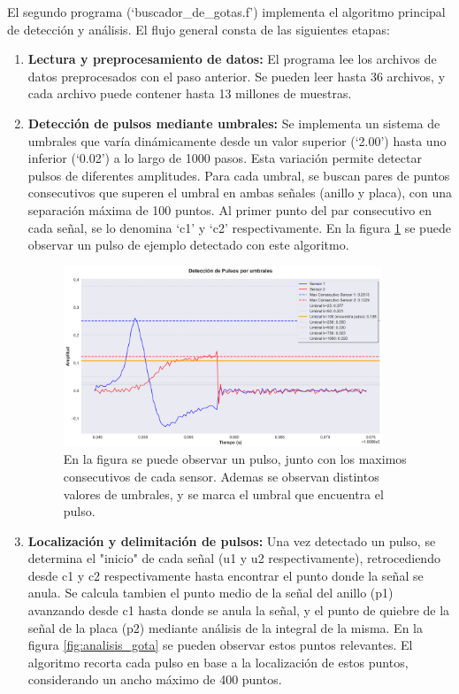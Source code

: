 \documentclass[12pt,a4paper]{article}
\begin{document}
El segundo programa (`buscador\_de\_gotas.f') implementa el algoritmo principal de
detección y análisis. El flujo general consta de las siguientes etapas:

\begin{enumerate}

\item \textbf{Lectura y preprocesamiento de datos:} El programa lee los archivos de datos
preprocesados con el paso anterior. Se pueden leer hasta 36 archivos, y cada archivo puede contener hasta 13 millones de muestras.

\item \textbf{Detección de pulsos mediante umbrales:} Se implementa un sistema de umbrales que varía dinámicamente desde un valor superior (`2.00') hasta
uno inferior (`0.02') a lo largo de 1000 pasos. Esta variación permite
detectar pulsos de diferentes amplitudes.
Para cada umbral, se buscan pares de puntos consecutivos que superen el umbral en ambas señales (anillo y placa), con una separación máxima de 100 puntos. Al primer punto del par consecutivo en cada señal, se lo denomina `c1' y `c2' respectivamente. En la figura \ref{fig:sensores_gota} se puede observar un pulso de ejemplo detectado con este algoritmo.

\begin{figure}[H]
    \centering
    \includegraphics[width=0.9\textwidth]{figures/sensores_gota.png}
    \caption{En la figura se puede observar un pulso, junto con los maximos consecutivos de cada sensor. Ademas se observan distintos valores de umbrales, y se marca el umbral que encuentra el pulso. }
    \label{fig:sensores_gota}
\end{figure}

\item \textbf{Localización y delimitación de pulsos:} Una vez detectado un pulso, se determina el "inicio" de cada señal (u1 y u2 respectivamente), retrocediendo desde c1 y c2 respectivamente hasta encontrar el punto donde la señal se anula.
Se calcula tambien el punto medio de la señal del anillo (p1) avanzando desde c1 hasta donde se anula la señal, y el punto de quiebre de la señal de la placa (p2) mediante análisis de la integral de la misma. En la figura \ref{fig:analisis_gota} se pueden observar estos puntos relevantes.
El algoritmo recorta cada pulso en base a la localización de estos puntos, considerando un ancho máximo de 400 puntos.


\end{enumerate}
\end{document}
